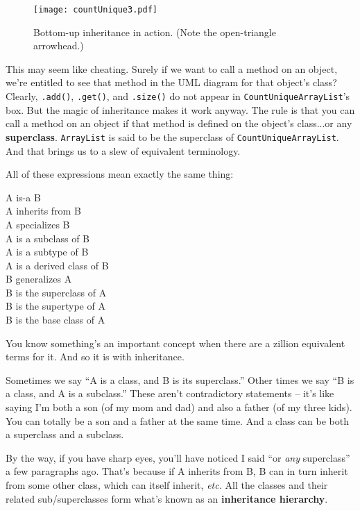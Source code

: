 \begin{figure}
\centering
\texttt{[image: countUnique3.pdf]}
\caption{Bottom-up inheritance in action. (Note the open-triangle arrowhead.)}
\label{fig:countUnique3}
\end{figure}

This may seem like cheating. Surely if we want to call a method on an object,
we're entitled to see that method in the UML diagram for that object's class?
Clearly, \texttt{.add()}, \texttt{.get()}, and \texttt{.size()} do not appear
in \texttt{CountUniqueArrayList}'s box. But the magic of inheritance makes it
work anyway. The rule is that you can call a method on an object if that
method is defined on the object's class...or any \textbf{superclass}.
\texttt{ArrayList} is said to be the superclass of
\texttt{CountUniqueArrayList}. And that brings us to a slew of equivalent
terminology.

\begin{samepage}
All of these expressions mean exactly the same thing:
\begin{center}
\small
A is-a B\\
A inherits from B\\
A specializes B\\
A is a subclass of B\\
A is a subtype of B\\
A is a derived class of B\\
B generalizes A\\
B is the superclass of A\\
B is the supertype of A\\
B is the base class of A\\
\end{center}
\end{samepage}

You know something's an important concept when there are a zillion equivalent
terms for it. And so it is with inheritance.

Sometimes we say ``A is a class, and B is its superclass.'' Other times we say
``B is a class, and A is a subclass.'' These aren't contradictory statements --
it's like saying I'm both a son (of my mom and dad) and also a father (of my
three kids). You can totally be a son and a father at the same time. And a
class can be both a superclass and a subclass.

By the way, if you have sharp eyes, you'll have noticed I said ``or
\textit{any} superclass'' a few paragraphs ago. That's because if A inherits
from B, B can in turn inherit from some other class, which can itself inherit,
\textit{etc.} All the classes and their related sub/superclasses form what's
known as an \textbf{inheritance hierarchy}.

